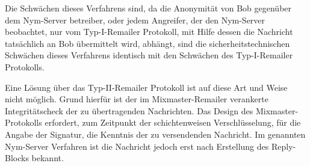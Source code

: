 Die Schwächen dieses Verfahrens sind, da die Anonymität von Bob gegenüber dem Nym-Server betreiber, oder jedem Angreifer, der den Nym-Server beobachtet, nur vom Typ-I-Remailer Protokoll, mit Hilfe dessen die Nachricht tatsächlich an Bob übermittelt wird, abhängt, sind die sicherheitstechnischen Schwächen dieses Verfahrens identisch mit den Schwächen des Typ-I-Remailer Protokolls.

Eine Lösung über das Typ-II-Remailer Protokoll ist auf diese Art und Weise nicht möglich. Grund hierfür ist der im Mixmaster-Remailer verankerte Integritätscheck der zu übertragenden Nachrichten. Das Design des Mixmaster-Protokolls erfordert, zum Zeitpunkt der schichtenweisen Verschlüsselung, für die Angabe der Signatur, die Kenntnis der zu versendenden Nachricht. Im genannten Nym-Server Verfahren ist die Nachricht jedoch erst nach Erstellung des Reply-Blocks bekannt.